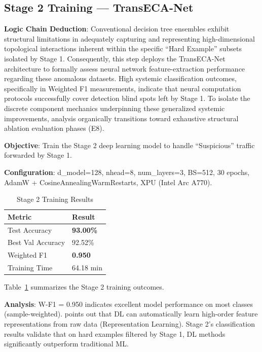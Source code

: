 \documentclass[sigconf]{acmart}
\begin{document}
\subsection{Stage 2 Training --- TransECA-Net}
\textbf{Logic Chain Deduction}: Conventional decision tree ensembles exhibit structural limitations in adequately capturing and representing high-dimensional topological interactions inherent within the specific ``Hard Example'' subsets isolated by Stage 1. Consequently, this step deploys the TransECA-Net architecture to formally assess neural network feature-extraction performance regarding these anomalous datasets. High systemic classification outcomes, specifically in Weighted F1 measurements, indicate that neural computation protocols successfully cover detection blind spots left by Stage 1. To isolate the discrete component mechanics underpinning these generalized systemic improvements, analysis organically transitions toward exhaustive structural ablation evaluation phases (E8).

\textbf{Objective}: Train the Stage 2 deep learning model to handle ``Suspicious'' traffic forwarded by Stage 1.

\textbf{Configuration}: d\_model=128, nhead=8, num\_layers=3, BS=512, 30 epochs, AdamW + CosineAnnealingWarmRestarts, XPU (Intel Arc A770).

\begin{table}[!h]
\caption{Stage 2 Training Results}
\label{tab:s2_results}
\begin{tabular}{ll}
\toprule
\textbf{Metric} & \textbf{Result} \\
\midrule
Test Accuracy & \textbf{93.00\%} \\
Best Val Accuracy & 92.52\% \\
Weighted F1 & \textbf{0.950} \\
Training Time & 64.18 min \\
\bottomrule
\end{tabular}
\end{table}

\noindent Table~\ref{tab:s2_results} summarizes the Stage 2 training outcomes.

\textbf{Analysis}: W-F1 = 0.950 indicates excellent model performance on most classes (sample-weighted). \cite{5} points out that DL can automatically learn high-order feature representations from raw data (Representation Learning). Stage 2's classification results validate that on hard examples filtered by Stage 1, DL methods significantly outperform traditional ML.
\end{document}
